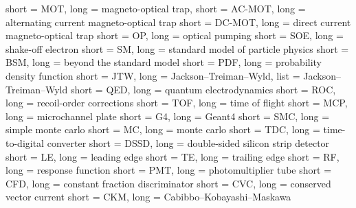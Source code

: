 % 
% 
% 

{
	short = MOT,
	long = magneto-optical trap,
}
{
	short = AC-MOT,
	long = alternating current magneto-optical trap
}
{
	short = DC-MOT,
	long = direct current magneto-optical trap
}
{
	short = OP,
	long = optical pumping
}
{
	short = SOE,
	long = shake-off electron
}
{
	short = SM,
	long = standard model of particle physics
}
{
	short = BSM,
	long = beyond the standard model
}
{
	short = PDF,
	long = probability density function
}
{
	short = JTW,
	long = Jackson--Treiman--Wyld,
	list = Jackson--Treiman--Wyld \cite{jtw}\cite{jtw_coulomb}
}
{
	short = QED,
	long = quantum electrodynamics
}
{
	short = ROC,
	long = recoil-order corrections
}
{
	short = TOF,
	long = time of flight
}
{
	short = MCP,
	long = microchannel plate
}
{
	short = G4,
	long = Geant4
}
{
	short = SMC,
	long = simple monte carlo
}
{
	short = MC,
	long = monte carlo
}
{
	short = TDC,
	long = time-to-digital converter
}
{
	short = DSSD,
	long = double-sided silicon strip detector
}
{
	short = LE,
	long = leading edge
}
{
	short = TE,
	long = trailing edge
}
{
	short = RF,
	long = response function
}
{
	short = PMT,
	long = photomultiplier tube
}
{
	short = CFD,
	long = constant fraction discriminator
}
{
	short = CVC,
	long = conserved vector current
}
{
	short = CKM,
	long = Cabibbo--Kobayashi--Maskawa
}













